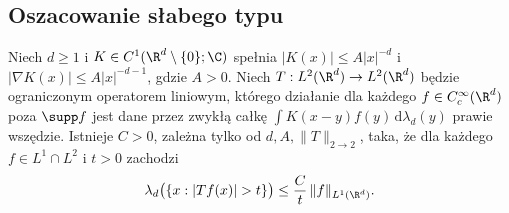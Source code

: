 \subsection{Oszacowanie słabego typu}
\begin{twierdzenie}
\label{thm:dt-cz-weak11}
Niech $d\ge1$ i $K\in C^1(\R^d\setminus\{0\};\C)$
spełnia $|K(x)|\le A|x|^{-d}$ i
$|\nabla K(x)|\le A|x|^{-d-1}$, gdzie $A>0$.
Niech $T:L^2(\R^d)\to L^2(\R^d)$ będzie ograniczonym
operatorem liniowym, którego działanie dla każdego
$f\in C_c^\infty(\R^d)$ poza $\supp f$ jest dane przez
zwykłą całkę $\int K(x-y)f(y)\,\mathrm d\lambda_d(y)$
prawie wszędzie.
Istnieje $C>0$, zależna tylko od $d,A,\|T\|_{2\to2}$,
taka, że dla każdego $f\in L^1\cap L^2$ i $t>0$ zachodzi
\begin{equation}\label{eq:dt-cz-weak11}
 \lambda_d\bigl(\{x:|Tf(x)|>t\}\bigr)
 \le \frac{C}{t}\,\|f\|_{L^1(\R^d)}.
\end{equation}
\end{twierdzenie}
